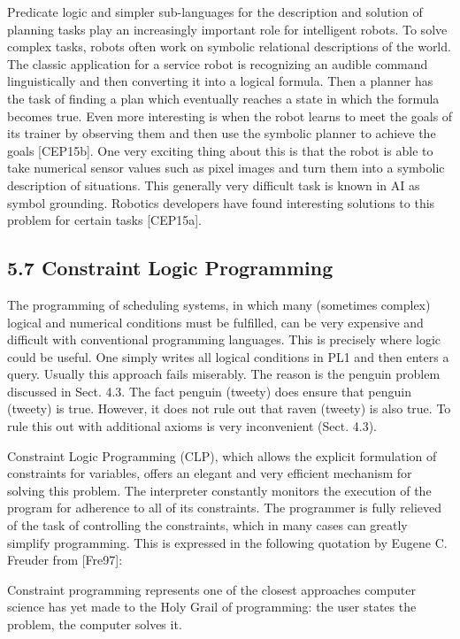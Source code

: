 \documentclass[10pt]{article}
\begin{document}
Predicate logic and simpler sub-languages for the description and solution of planning tasks play an increasingly important role for intelligent robots. To solve complex tasks, robots often work on symbolic relational descriptions of the world. The classic application for a service robot is recognizing an audible command linguistically and then converting it into a logical formula. Then a planner has the task of finding a plan which 
eventually reaches a state in which the formula becomes true. Even more interesting is when the robot learns to meet the goals of its trainer by observing them and then use the symbolic planner to achieve the goals [CEP15b]. One very exciting thing about this is that the robot is able to take numerical sensor values such as pixel images and turn them into a symbolic description of situations. This generally very difficult task is known in AI as symbol grounding. Robotics developers have found interesting solutions to this problem for certain tasks [CEP15a].

\subsection*{5.7 Constraint Logic Programming}
The programming of scheduling systems, in which many (sometimes complex) logical and numerical conditions must be fulfilled, can be very expensive and difficult with conventional programming languages. This is precisely where logic could be useful. One simply writes all logical conditions in PL1 and then enters a query. Usually this approach fails miserably. The reason is the penguin problem discussed in Sect. 4.3. The fact penguin (tweety) does ensure that penguin (tweety) is true. However, it does not rule out that raven (tweety) is also true. To rule this out with additional axioms is very inconvenient (Sect. 4.3).

Constraint Logic Programming (CLP), which allows the explicit formulation of constraints for variables, offers an elegant and very efficient mechanism for solving this problem. The interpreter constantly monitors the execution of the program for adherence to all of its constraints. The programmer is fully relieved of the task of controlling the constraints, which in many cases can greatly simplify programming. This is expressed in the following quotation by Eugene C. Freuder from [Fre97]:

\begin{displayquote}
Constraint programming represents one of the closest approaches computer science has yet made to the Holy Grail of programming: the user states the problem, the computer solves it.
\end{displayquote}
\end{document}
